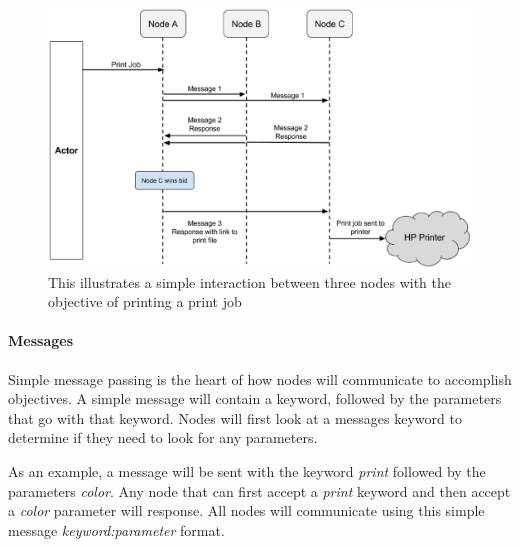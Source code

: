 \documentclass[draftclsnofoot, onecolumn, compsoc, 10pt]{IEEEtran}
\begin{document}
\begin{figure}[H]
\centering
	\includegraphics[scale=0.4]{sequence}
	\captionsetup{justification=centering}
    \caption{This illustrates a simple interaction between three nodes with the objective of printing a print job}
\end{figure}

\paragraph{Messages}
Simple message passing is the heart of how nodes will communicate to accomplish objectives. A simple message will contain a keyword, followed by the parameters that go with that keyword. Nodes will first look at a messages keyword to determine if they need to look for any parameters. 

As an example, a message will be sent with the keyword \textit{print} followed by the parameters \textit{color}. Any node that can first accept a \textit{print} keyword and then accept a \textit{color} parameter will response. All nodes will communicate using this simple message  \textit{keyword:parameter} format. 
\end{document}
